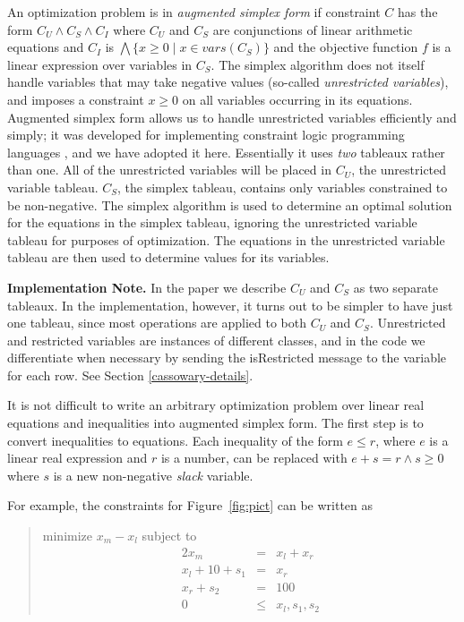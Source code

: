 \documentclass{article}
\begin{document}
An optimization problem is in \emph{augmented simplex form} if constraint
$C$ has the form $C_U \wedge C_S \wedge C_I$ where $C_U$ and $C_S$ are
conjunctions of linear arithmetic equations and $C_I$ is $\bigwedge \{ x
\geq 0 \mid x \in vars(C_S)\}$ and the objective function $f$ is a linear
expression over variables in $C_S$\@.  The simplex algorithm does not itself
handle variables that may take negative values (so-called {\em
unrestricted variables}), and imposes a constraint $x \geq 0$ on all
variables occurring in its equations.  Augmented simplex form allows us to
handle unrestricted variables efficiently and simply; it was developed for
implementing constraint logic programming languages
\cite{marriott-stuckey-book}, and we have adopted it here.  Essentially it
uses {\em two} tableaux rather than one.  All of the unrestricted
variables will be placed in $C_U$, the unrestricted variable tableau.
$C_S$, the simplex tableau, contains only variables constrained to be
non-negative.  The simplex algorithm is used to determine an optimal
solution for the equations in the simplex tableau, ignoring the
unrestricted variable tableau for purposes of optimization.  The equations
in the unrestricted variable tableau are then used to determine values for
its variables.

{\bf Implementation Note.}  In the paper we describe $C_U$ and $C_S$ as
two separate tableaux.  In the implementation, however, it turns out to be
simpler to have just one tableau, since most operations are applied to both
$C_U$ and $C_S$.  Unrestricted and restricted variables are instances of
different classes, and in the code
we differentiate when necessary by sending the {\sf
isRestricted} message to the variable for each row.  See Section
\ref{cassowary-details}.

It is not difficult to write an arbitrary optimization problem over linear
real equations and inequalities into augmented simplex form.  The first
step is to convert inequalities to equations.  Each inequality of the form
$e \leq r$, where $e$ is a linear real expression and $r$ is a number, can be
replaced with $e + s = r \wedge s \geq 0$ where $s$ is a new non-negative
\emph{slack} variable.

For example, the constraints for Figure~\ref{fig:pict} can be written as
\begin{quote}\vspace*{-1ex}
minimize $x_m - x_l$ 
subject to 
$$\begin{array}{rcl}
2 x_m & = & x_l + x_r \\
x_l + 10 + s_1& = &x_r \\
x_r + s_2 &= &100 \\
0 &\leq & x_l, s_1, s_2
\end{array}$$
\end{quote}\vspace{-0.9ex}
\end{document}
